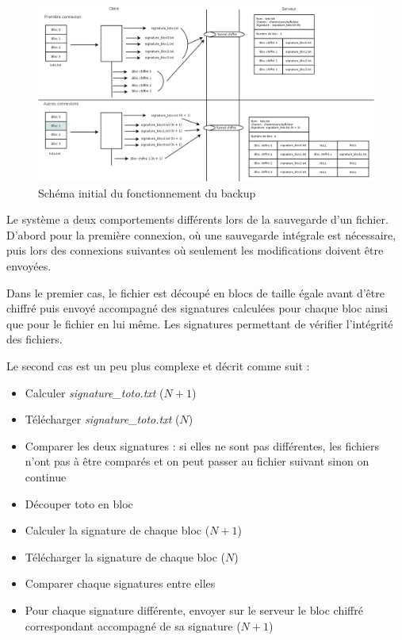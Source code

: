 \documentclass[a4paper,10pt, twoside]{report}
\begin{document}
\begin{spacing}{1.2}
\begin{figure}[h!]
    \hspace{-4.5em}
    \includegraphics[width=19cm]{algo/schemaInitial.png}
    \caption{\label{schemaInitial} Schéma initial du fonctionnement du backup}
\end{figure}

Le système a deux comportements différents lors de la sauvegarde d'un fichier.
D'abord pour la première connexion, où une sauvegarde intégrale est
nécessaire, puis lors des connexions suivantes où seulement les
modifications doivent être envoyées.

Dans le premier cas, le fichier est découpé en blocs de taille égale
avant d'être chiffré puis envoyé accompagné des signatures calculées
pour chaque bloc ainsi que pour le fichier en lui même. Les signatures
permettant de vérifier l'intégrité des fichiers.

Le second cas est un peu plus complexe et décrit comme suit :
\begin{itemize}
 \item Calculer \textit{signature\_toto.txt} (\(N + 1\))
 \item Télécharger \textit{signature\_toto.txt} (\(N\))
 \item Comparer les deux signatures : si elles ne sont pas différentes, les
 fichiers n'ont pas à être comparés et on peut passer au fichier suivant
 sinon on continue
 \item Découper toto en bloc
 \item Calculer la signature de chaque bloc (\(N + 1\))
 \item Télécharger la signature de chaque bloc (\(N\))
 \item Comparer chaque signatures entre elles
 \item Pour chaque signature différente, envoyer sur le serveur le bloc
 chiffré correspondant accompagné de sa signature (\(N + 1\))
\end{itemize}


\end{spacing}
\end{document}
